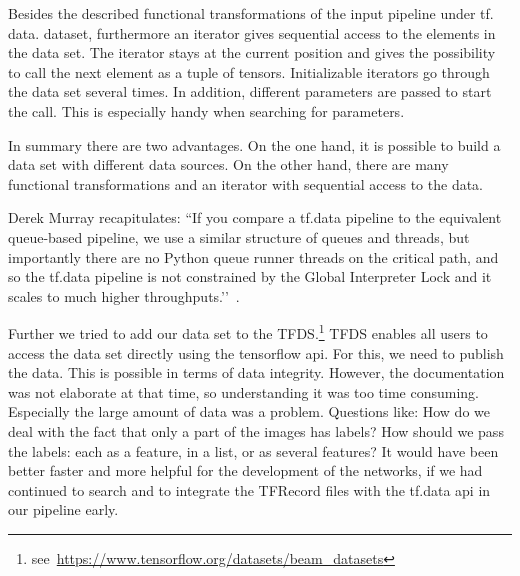 Besides the described functional transformations of the input pipeline under tf.\- data.\- dataset, furthermore an iterator gives sequential access to the elements in the data set. The iterator stays at the current position and gives the possibility to call the next element as a tuple of tensors. Initializable iterators go through the data set several times. In addition, different parameters are passed to start the call. This is especially handy when searching for parameters.

\bigskip
In summary there are two advantages. On the one hand, it is possible to build a data set with different data sources. On the other hand, there are many functional transformations and an iterator with sequential access to the data.

Derek Murray recapitulates: ``If you compare a tf.data pipeline to the equivalent queue-based pipeline, we use a similar structure of queues and threads, but importantly there are no Python queue runner threads on the critical path, and so the tf.data pipeline is not constrained by the Global Interpreter Lock and it scales to much higher throughputs.’’~\citep{dataAPI}. 

Further we tried to add our data set to the TFDS.\footnote{see~\url{https://www.tensorflow.org/datasets/beam\_datasets}} TFDS enables all users to access the data set directly using the tensorflow api. For this, we need to publish the data. This is possible in terms of data integrity. However, the documentation was not elaborate at that time, so understanding it was too time consuming. Especially the large amount of data was a problem. Questions like: How do we deal with the fact that only a part of the images has labels? How should we pass the labels: each as a feature, in a list, or as several features? It would have been better faster and more helpful for the development of the networks, if we had continued to search and to integrate the TFRecord files with the tf.data api in our pipeline early. 
